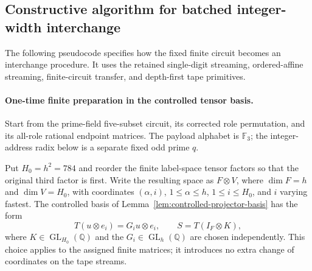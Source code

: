 \subsection{Constructive algorithm for batched integer-width interchange}
\label{sec:batched-algorithms}

The following pseudocode specifies how the fixed finite circuit becomes
an interchange procedure.  It uses the retained single-digit streaming,
ordered-affine streaming, finite-circuit transfer, and depth-first tape
primitives.

\paragraph{One-time finite preparation in the controlled tensor basis.}
Start from the prime-field five-subset circuit, its corrected role
permutation, and its all-role rational endpoint matrices.  The payload
alphabet is $\mathbb F_3$; the integer-address radix below is a separate
fixed odd prime $q$.

Put $H_0=h^2=784$ and reorder the finite label-space tensor factors so
that the original third factor is first.  Write the resulting space as
$F\otimes V$, where $\dim F=h$ and $\dim V=H_0$, with coordinates
$(\alpha,i)$, $1\le\alpha\le h$, $1\le i\le H_0$, and $i$ varying
fastest.  The controlled basis of
Lemma~\ref{lem:controlled-projector-basis} has the form
\[
 T(u\otimes e_i)=G_i u\otimes e_i,
 \qquad S=T(I_F\otimes K),
\]
where $K\in\operatorname{GL}_{H_0}(\mathbb Q)$ and the
$G_i\in\operatorname{GL}_h(\mathbb Q)$ are chosen independently.
This choice applies to the assigned finite matrices; it introduces no
extra change of coordinates on the tape streams.


